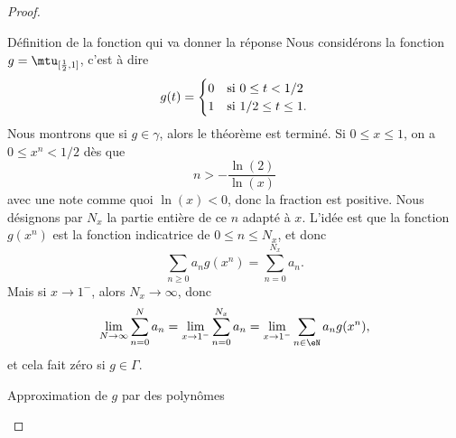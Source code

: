 \begin{proof}
\begin{subproof}
    \item[Définition de la fonction qui va donner la réponse]
        Nous considérons la fonction \( g=\mtu_{\mathopen[ \frac{ 1 }{2} , 1 \mathclose]}\), c'est à dire
        \begin{equation}
            g(t)=\begin{cases}
                0    &   \text{si \( 0\leq t<1/2\)}\\
                1    &    \text{si \( 1/2\leq t\leq 1\)}.
            \end{cases}
        \end{equation}
        Nous montrons que si \( g\in \gamma\), alors le théorème est terminé. Si \( 0\leq x\leq 1\), on a \( 0\leq x^n<1/2\) dès que
        \begin{equation}
            n>-\frac{ \ln(2) }{ \ln(x) }
        \end{equation}
        avec une note comme quoi \( \ln(x)<0\), donc la fraction est positive. Nous désignons par \( N_x\) la partie entière de ce \( n\) adapté à \( x\). L'idée est que la fonction  \( g(x^n)\) est la fonction indicatrice de \(0 \leq n\leq N_x\), et donc
        \begin{equation}
            \sum_{n\geq 0}a_ng(x^n)=\sum_{n=0}^{N_x}a_n.
        \end{equation}
        Mais si \( x\to 1^-\), alors \( N_x\to \infty\), donc
        \begin{equation}
            \lim_{N\to \infty} \sum_{n=0}^Na_n=\lim_{x\to 1^-} \sum_{n=0}^{N_x}a_n=\lim_{x\to 1^-} \sum_{n\in \eN}a_ng(x^n),
        \end{equation}
        et cela fait zéro si \( g\in \Gamma\).
        
    \item[Approximation de \( g\) par des polynômes]


\end{subproof}
\end{proof}
